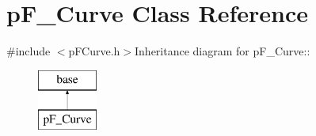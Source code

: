 \hypertarget{classp_f___curve}{
\section{pF\_\-Curve Class Reference}
\label{classp_f___curve}
}


{\ttfamily \#include $<$pFCurve.h$>$}Inheritance diagram for pF\_\-Curve::\begin{figure}[H]
\begin{center}
\leavevmode
\includegraphics[height=2cm]{classp_f___curve}
\end{center}
\end{figure}
